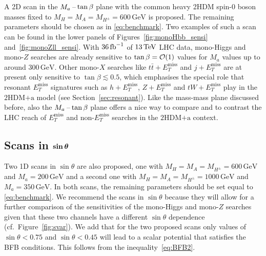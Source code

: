 \documentclass[review]{elsarticle}
\newcommand{\MET}{\ensuremath{E_T^\mathrm{miss}}\xspace}
\newcommand{\mA}{\ensuremath{M_{A}}\xspace}
\newcommand{\ma}{\ensuremath{M_{a}}\xspace}
\newcommand{\mH}{\ensuremath{M_{H}}\xspace}
\newcommand{\mHc}{\ensuremath{M_{H^{\pm}}}\xspace}
\newcommand{\hdma}{\ensuremath{\textrm{2HDM+a}}\xspace}
\def\bm#1{\mbox{\boldmath$#1$\unboldmath}}
\begin{document}
A 2D scan in the  $\ma\hspace{0.5mm}$--$\hspace{0.5mm} \tan \beta$ plane with  the common heavy 2HDM  spin-0 boson  masses fixed to $\mH = \mA = \mHc = 600 \, {\mathrm{GeV}}$ is proposed.  The remaining parameters should be chosen as in \eqref{eq:benchmark}. Two examples of such a scan can be found in the lower panels of Figures~\ref{fig:monoHbb_sensi} and~\ref{fig:monoZll_sensi}. With $36 \, {\rm fb}^{-1}$ of $13 \, {\rm TeV}$ LHC data, mono-Higgs and mono-$Z$ searches are already sensitive to $\tan \beta = {\cal O} (1)$ values for $M_a$ values up to around $300 \, {\mathrm{GeV}}$. Other mono-$X$ searches like $t \bar t +\MET$ and $j + \MET$ are at present only sensitive to $\tan \beta \lesssim 0.5$, which emphasises the special role that  resonant $\MET$ signatures such as $h + \MET$, $Z + \MET$ and $tW + \MET$ play in the \hdma model (see Section~\ref{sec:resonant}). Like  the mass-mass plane discussed before, also the $\ma\hspace{0.5mm}$--$\hspace{0.5mm} \tan \beta$ plane offers a nice way to compare and to contrast the LHC reach of $\MET$ and non-$\MET$ searches in the \hdma context. 

\subsection[Scans in $\sin \theta$]{Scans in $\bm{\sin \theta}$}

Two 1D  scans in $\sin \theta$ are also proposed, one with $\mH = \mA = \mHc = 600 \, {\mathrm{GeV}}$ and $\ma = 200 \, {\mathrm{GeV}}$ and a second one with $\mH = \mA = \mHc = 1000 \, {\mathrm{GeV}}$ and $\ma = 350 \, {\mathrm{GeV}}$. In both scans, the remaining parameters should be set equal to \eqref{eq:benchmark}.  We recommend the scans in $\sin \theta$ because they will  allow for a further comparison of the sensitivities of the mono-Higgs and mono-$Z$ searches given that these two channels have a different $\sin \theta$ dependence (cf.~Figure~\ref{fig:svar}).  We add that for the two proposed scans only values of $\sin \theta < 0.75$ and $\sin \theta < 0.45$ will lead to a scalar potential that satisfies the BFB conditions. This follows from the inequality~\eqref{eq:BFB2}.
\end{document}
